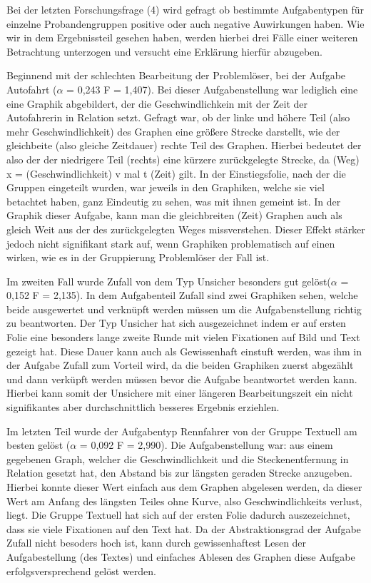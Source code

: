 Bei der letzten Forschungsfrage (4) wird gefragt ob bestimmte Aufgabentypen für einzelne Probandengruppen positive oder auch negative Auwirkungen haben. Wie wir in dem Ergebnissteil gesehen haben, werden hierbei drei Fälle einer weiteren Betrachtung unterzogen und versucht eine Erklärung hierfür abzugeben. 

Beginnend mit der schlechten Bearbeitung der Problemlöser, bei der Aufgabe Autofahrt ($\alpha$ = 0,243 F = 1,407).  Bei dieser Aufgabenstellung war lediglich eine eine Graphik abgebildert, der die Geschwindlichkein mit der Zeit der Autofahrerin in Relation setzt. Gefragt war, ob der linke und höhere Teil (also mehr Geschwindlichkeit)  des Graphen eine größere Strecke darstellt, wie der gleichbeite (also gleiche Zeitdauer) rechte Teil des Graphen.  Hierbei bedeutet der also der der niedrigere Teil (rechts) eine kürzere zurückgelegte Strecke, da  (Weg) x = (Geschwindlichkeit)  v mal t (Zeit) gilt. In der Einstiegsfolie, nach der die Gruppen eingeteilt wurden, war jeweils in den Graphiken, welche sie viel betachtet haben, ganz Eindeutig zu sehen, was mit ihnen gemeint ist. In der Graphik dieser Aufgabe, kann man die gleichbreiten (Zeit) Graphen auch als gleich Weit aus der des zurückgelegten Weges missverstehen. Dieser Effekt stärker jedoch nicht signifikant stark auf, wenn Graphiken problematisch auf einen wirken, wie es in der Gruppierung Problemlöser der Fall ist.

Im zweiten Fall wurde Zufall von dem Typ Unsicher besonders gut gelöst($\alpha$ = 0,152 F = 2,135). In dem Aufgabenteil Zufall sind zwei Graphiken sehen, welche beide ausgewertet und verknüpft werden müssen um die Aufgabenstellung richtig zu beantworten. Der Typ Unsicher hat sich ausgezeichnet indem er auf ersten Folie eine besonders lange zweite Runde mit vielen Fixationen auf Bild und Text gezeigt hat. Diese Dauer kann auch als Gewissenhaft einstuft werden, was ihm in der Aufgabe Zufall zum Vorteil wird, da die beiden Graphiken zuerst abgezählt und dann verküpft werden müssen bevor die Aufgabe beantwortet werden kann. Hierbei kann somit der Unsichere mit einer längeren Bearbeitungszeit ein nicht signifikantes aber durchschnittlich besseres Ergebnis erziehlen. 

Im letzten Teil wurde der Aufgabentyp Rennfahrer von der Gruppe Textuell am besten gelöst ($\alpha$ = 0,092 F = 2,990). Die Aufgabenstellung war: aus einem gegebenen Graph, welcher die Geschwindlichkeit und die Steckenentfernung in Relation gesetzt hat, den Abstand bis zur längsten geraden Strecke anzugeben. Hierbei konnte dieser Wert einfach aus dem Graphen abgelesen werden, da dieser Wert am Anfang des längsten Teiles ohne Kurve, also Geschwindlichkeits verlust, liegt. Die Gruppe Textuell hat sich auf der ersten Folie dadurch auszezeichnet, dass sie viele Fixationen auf den Text hat. Da der Abstraktionsgrad der Aufgabe Zufall nicht besoders hoch ist, kann durch gewissenhaftest Lesen der Aufgabestellung (des Textes) und einfaches Ablesen des Graphen diese Aufgabe erfolgsversprechend gelöst werden. 

